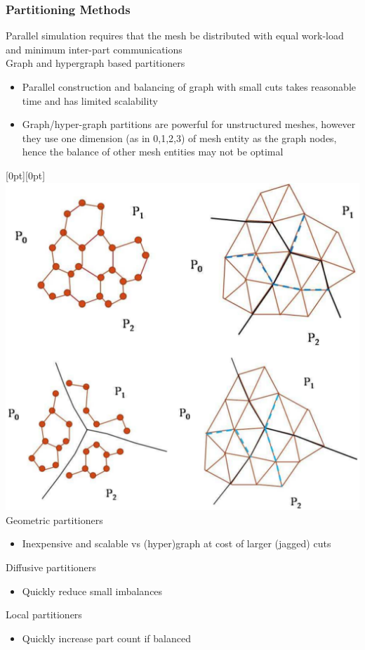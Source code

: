 \documentclass{beamer}
\newcommand{\lenitem}[2][.6\linewidth]{\parbox[t]{#1}{\strut #2\strut}}
\begin{document}
\begin{frame}
  \frametitle{Partitioning Methods}
  Parallel simulation requires that the mesh be distributed with equal
  work-load and minimum inter-part communications \\
  \bigskip
  Graph and hypergraph based partitioners
  \begin{itemize}
    \item Parallel construction and balancing of graph with small cuts
      takes reasonable time and has limited scalability
    \item Graph/hyper-graph partitions are powerful for unstructured
      meshes, however they use one dimension (as in 0,1,2,3) of mesh entity
      as the graph nodes, hence the balance of other mesh entities may
      not be optimal
  \end{itemize}
  \vskip-10pt
  \mbox{}\hfill\raisebox{-\height}[0pt][0pt]{
    \includegraphics[width=.30\textwidth]{../parmaimprovement/figs/localVsGlobalZhou.eps}
  }\\
  Geometric partitioners
  \begin{itemize}
    \item \lenitem{Inexpensive and scalable vs (hyper)graph at cost of larger
      (jagged) cuts}
  \end{itemize}
  Diffusive partitioners
  \begin{itemize}
    \item \lenitem{Quickly reduce small imbalances}
  \end{itemize}
  Local partitioners
  \begin{itemize}
    \item \lenitem{Quickly increase part count if balanced}
  \end{itemize}
\end{frame}
\end{document}
